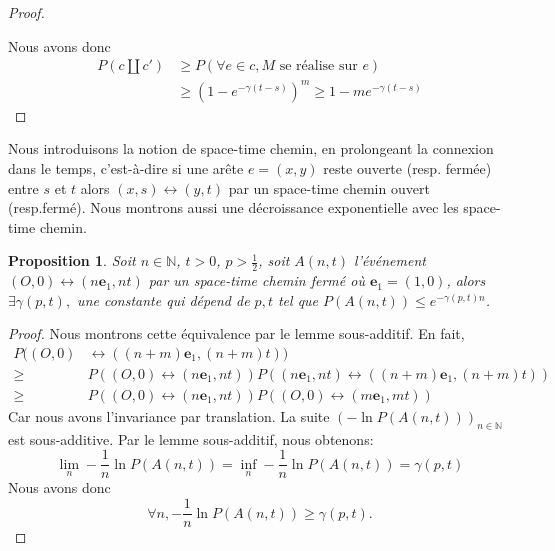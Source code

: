 \documentclass[titlepage,a4paper,12pt]{article}
\newcounter{prop}
\newtheorem{stc}[prop]{Proposition}
\begin{document}
\begin{proof}
\begin{figure}[h]
\end{figure}

Nous avons donc 
\begin{align*}
 P(c \coprod c') &\geqslant P(\forall e \in c, M \text{ se réalise sur } e) \\
 & \geqslant (1-e^{-\gamma (t-s)})^m \geqslant 1-me^{-\gamma (t-s)}
\end{align*} 
\end{proof}

Nous introduisons la notion de space-time chemin, en prolongeant la connexion dans le temps, c'est-à-dire si une arête $e=(x,y)$ reste ouverte (resp. fermée) entre $s$ et $t$ alors $(x,s)\longleftrightarrow (y,t)$ par un space-time chemin ouvert (resp.fermé). Nous montrons aussi une décroissance exponentielle avec les space-time chemin.

\begin{stc} \label{stc} Soit $n\in \mathbb{N}$, $t>0$, $p> \frac{1}{2}$, soit $ A(n,t)$ l'événement $(O,0) \leftrightarrow (n\mathbf{e}_1,nt)$ par un space-time chemin fermé où $\mathbf{e}_1 = (1,0)$, alors $\exists \gamma(p,t),$ une constante qui dépend de $p,t$ tel que $P(A(n,t)) \leqslant e^{-\gamma(p,t)n}$.
\end{stc}

\begin{proof}
Nous montrons cette équivalence par le lemme sous-additif. En fait, 
\begin{align*}
P((O,0)& \leftrightarrow ((n+m)\mathbf{e}_1,(n+m)t)) \\
\geqslant & P((O,0)\leftrightarrow (n\mathbf{e}_1,nt))P((n\mathbf{e}_1,nt)\leftrightarrow ((n+m)\mathbf{e}_1,(n+m)t))\\
\geqslant & P((O,0)\leftrightarrow (n\mathbf{e}_1,nt))P((O,0)\leftrightarrow (m\mathbf{e}_1,mt))
\end{align*}
Car nous avons l'invariance par translation. La suite $(-\ln P(A(n,t)))_{n\in \mathbb{N}}$ est sous-additive. Par le lemme sous-additif, nous obtenons:
$$
\lim_{n}-\frac{1}{n}\ln P(A(n,t)) = \inf_{n} -\frac{1}{n}\ln P(A(n,t)) = \gamma(p,t)
$$
Nous avons donc
$$ \forall n, -\frac{1}{n}\ln P(A(n,t)) \geqslant \gamma(p,t).
$$
\end{proof}
\end{document}
